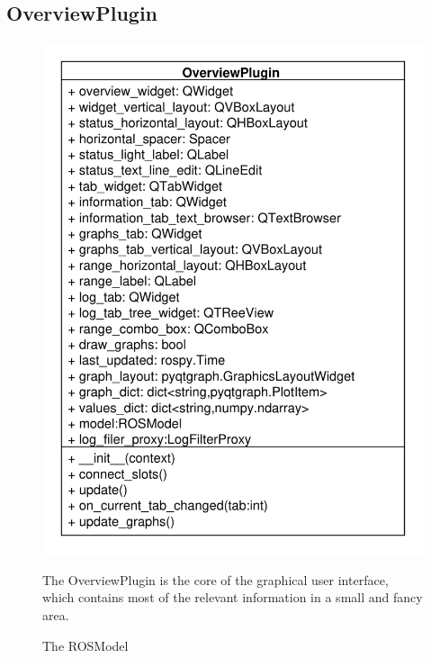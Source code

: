 \subsection{OverviewPlugin}
\begin{figure}[htbp]
	\begin{minipage}[t]{7cm}
		\vspace{0pt}
		\centering
		\includegraphics[scale=0.6]{./diagram_pictures/Overview.pdf}
		\caption{The ROSModel}
	\end{minipage}
	\hfill
	\begin{minipage}[t]{8cm}
		\vspace{10pt}
		The OverviewPlugin is the core of the graphical user interface, which
		contains most of the relevant information in a small and fancy area.
	\end{minipage}
\end{figure} 
